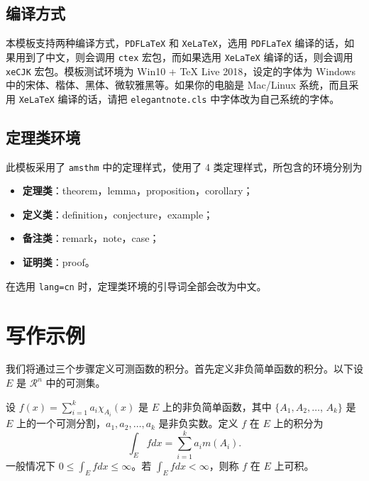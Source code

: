 \documentclass[cn,normal,11pt]{../elegantnote}
\begin{document}
\subsection{编译方式}

本模板支持两种编译方式，\lstinline{PDFLaTeX} 和 \lstinline{XeLaTeX}，选用 \lstinline{PDFLaTeX} 编译的话，如果用到了中文，则会调用 \lstinline{ctex} 宏包，而如果选用 \lstinline{XeLaTeX} 编译的话，则会调用 \lstinline{xeCJK} 宏包。模板测试环境为 Win10 + \TeX{} Live 2018，设定的字体为 Windows 中的宋体、楷体、黑体、微软雅黑等。如果你的电脑是 Mac/Linux 系统，而且采用 \lstinline{XeLaTeX} 编译的话，请把 \lstinline{elegantnote.cls} 中字体改为自己系统的字体。

\subsection{定理类环境}
此模板采用了 \lstinline{amsthm} 中的定理样式，使用了 4 类定理样式，所包含的环境分别为
\begin{itemize}
\item \textbf{定理类}：theorem，lemma，proposition，corollary；
\item \textbf{定义类}：definition，conjecture，example；
\item \textbf{备注类}：remark，note，case；
\item \textbf{证明类}：proof。
\end{itemize}

\begin{remark}
在选用 \lstinline{lang=cn} 时，定理类环境的引导词全部会改为中文。
\end{remark}

\section{写作示例}

我们将通过三个步骤定义可测函数的积分。首先定义非负简单函数的积分。以下设 $E$ 是 $\mathcal{R}^n$ 中的可测集。

\begin{definition}[可积性]
设 $ f(x)=\sum\limits_{i=1}^{k} a_i \chi_{A_i}(x)$ 是 $E$ 上的非负简单函数，其中 $\{A_1,A_2,\ldots$, $A_k\}$ 是 $E$ 上的一个可测分割，$a_1,a_2,\ldots,a_k$ 是非负实数。定义 $f$ 在 $E$ 上的积分为
\begin{equation}
   \label{inter}
   \int_{E} f dx = \sum_{i=1}^k a_i m(A_i).
\end{equation}
一般情况下 $0 \leq \int_{E} f dx \leq \infty$。若 $\int_{E} f dx < \infty$，则称 $f$ 在 $E$ 上可积。
\end{definition}
\end{document}
